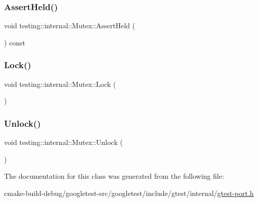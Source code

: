 \subsubsection{\texorpdfstring{AssertHeld()}{AssertHeld()}}
{\footnotesize\ttfamily void testing\+::internal\+::\+Mutex\+::\+Assert\+Held (\begin{DoxyParamCaption}{ }\end{DoxyParamCaption}) const\hspace{0.3cm}{\ttfamily [inline]}}

\mbox{\label{classtesting_1_1internal_1_1Mutex_ae7e2191886c00182176b23c4f4d049f8}} 
\subsubsection{\texorpdfstring{Lock()}{Lock()}}
{\footnotesize\ttfamily void testing\+::internal\+::\+Mutex\+::\+Lock (\begin{DoxyParamCaption}{ }\end{DoxyParamCaption})\hspace{0.3cm}{\ttfamily [inline]}}

\mbox{\label{classtesting_1_1internal_1_1Mutex_a315188055de1be98884519ad84eff2e6}} 
\subsubsection{\texorpdfstring{Unlock()}{Unlock()}}
{\footnotesize\ttfamily void testing\+::internal\+::\+Mutex\+::\+Unlock (\begin{DoxyParamCaption}{ }\end{DoxyParamCaption})\hspace{0.3cm}{\ttfamily [inline]}}



The documentation for this class was generated from the following file\+:\begin{DoxyCompactItemize}
\item 
cmake-\/build-\/debug/googletest-\/src/googletest/include/gtest/internal/\mbox{\hyperlink{gtest-port_8h}{gtest-\/port.\+h}}\end{DoxyCompactItemize}
